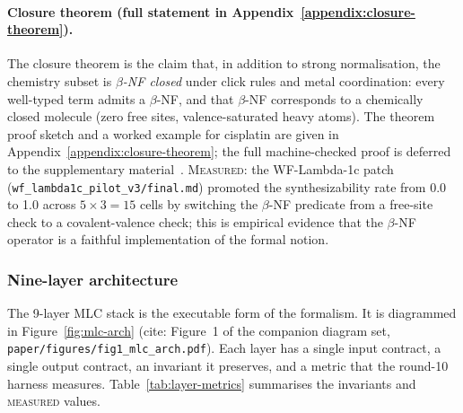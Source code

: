 \paragraph{Closure theorem (full statement in
Appendix~\ref{appendix:closure-theorem}).}
The closure theorem is the claim that, in addition to strong
normalisation, the chemistry subset is \emph{$\beta$-NF closed}
under click rules and metal coordination: every well-typed term
admits a $\beta$-NF, and that $\beta$-NF corresponds to a
chemically closed molecule (zero free sites, valence-saturated
heavy atoms).
The theorem proof sketch and a worked example for cisplatin are
given in Appendix~\ref{appendix:closure-theorem}; the full
machine-checked proof is deferred to the supplementary
material~\cite{appendix:closure-theorem}.
\textsc{Measured}: the WF-Lambda-1c patch
(\texttt{wf\_lambda1c\_pilot\_v3/final.md}) promoted the
synthesizability rate from 0.0 to 1.0 across $5 \times 3 = 15$
cells by switching the $\beta$-NF predicate from a free-site
check to a covalent-valence check; this is empirical evidence
that the $\beta$-NF operator is a faithful implementation of the
formal notion.

\subsubsection{Nine-layer architecture}
\label{sec:mlc-layers}

The 9-layer MLC stack is the executable form of the formalism.
It is diagrammed in Figure~\ref{fig:mlc-arch} (cite: Figure~1 of
the companion diagram set, \texttt{paper/figures/fig1\_mlc\_arch.pdf}).
Each layer has a single input contract, a single output contract,
an invariant it preserves, and a metric that the round-10
harness measures.
Table~\ref{tab:layer-metrics} summarises the invariants and
\textsc{measured} values.

